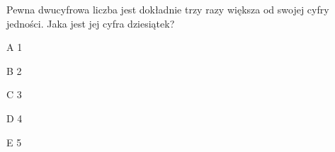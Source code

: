 \begin{tresc}
Pewna dwucyfrowa liczba jest dokładnie trzy razy większa od swojej cyfry jedności. Jaka jest jej cyfra dziesiątek?
\end{tresc}
\begin{wariant}{A} 1 \end{wariant}
\begin{wariant}{B} 2 \end{wariant}
\begin{wariant}{C} 3 \end{wariant}
\begin{wariant}{D} 4 \end{wariant}
\begin{wariant}{E} 5 \end{wariant}
